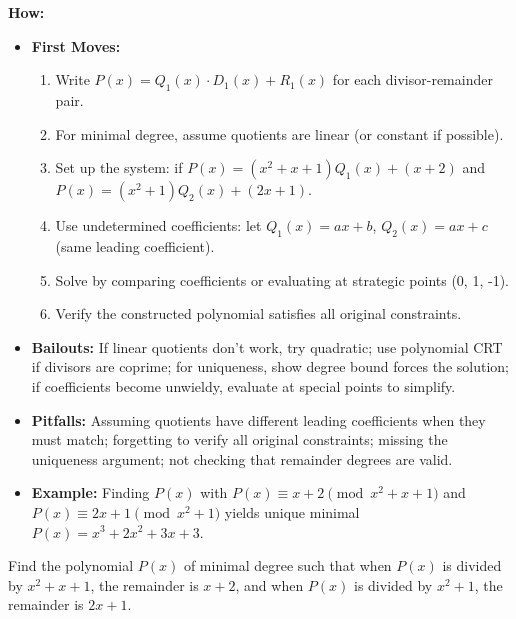 \documentclass[12pt]{article}
\newenvironment{problem}[1]
{\begin{tcolorbox}[colback=blue!5!white,colframe=blue!75!black,title={#1}]}{\end{tcolorbox}}
\begin{document}
\textbf{How:}
\begin{itemize}
    \item \textbf{First Moves:}
    \begin{enumerate}[nosep]
        \item Write $P(x) = Q_1(x) \cdot D_1(x) + R_1(x)$ for each divisor-remainder pair.
        \item For minimal degree, assume quotients are linear (or constant if possible).
        \item Set up the system: if $P(x) = (x^2+x+1)Q_1(x) + (x+2)$ and $P(x) = (x^2+1)Q_2(x) + (2x+1)$.
        \item Use undetermined coefficients: let $Q_1(x) = ax+b$, $Q_2(x) = ax+c$ (same leading coefficient).
        \item Solve by comparing coefficients or evaluating at strategic points (0, 1, -1).
        \item Verify the constructed polynomial satisfies all original constraints.
    \end{enumerate}
    \item \textbf{Bailouts:} If linear quotients don't work, try quadratic; use polynomial CRT if divisors are coprime; for uniqueness, show degree bound forces the solution; if coefficients become unwieldy, evaluate at special points to simplify.
    \item \textbf{Pitfalls:} Assuming quotients have different leading coefficients when they must match; forgetting to verify all original constraints; missing the uniqueness argument; not checking that remainder degrees are valid.
    \item \textbf{Example:} Finding $P(x)$ with $P(x) \equiv x+2 \pmod{x^2+x+1}$ and $P(x) \equiv 2x+1 \pmod{x^2+1}$ yields unique minimal $P(x) = x^3+2x^2+3x+3$.
\end{itemize}

\begin{problem}{Example: Minimal Polynomial with Two Remainder Conditions}
Find the polynomial $P(x)$ of minimal degree such that when $P(x)$ is divided by $x^2+x+1$, the remainder is $x+2$, and when $P(x)$ is divided by $x^2+1$, the remainder is $2x+1$.
\end{problem}
\end{document}
